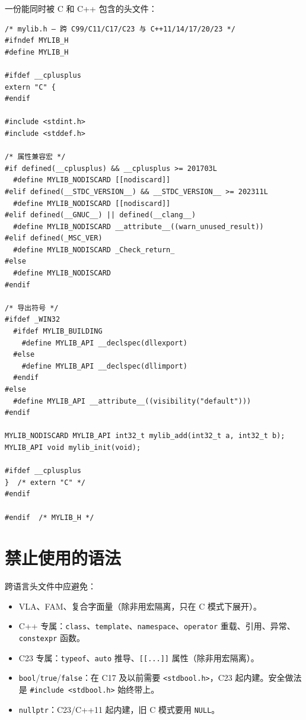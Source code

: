 \documentclass[12pt,a4paper,fontset=fandol]{ctexbook}
\newcommand{\cpplabel}{%
  \tcbox[on line,colback=cppheadbg,colframe=cppheadbg,
    boxrule=0pt,arc=1pt,left=2pt,right=2pt,top=1pt,bottom=1pt,
    colupper=white,fontupper=\scriptsize\bfseries]{C++}}
\newcommand{\cpp}[1]{C++#1}
\newcommand{\kw}[1]{\texttt{#1}}
\begin{document}
\cpplabel{} 一份能同时被 C 和 \cpp{} 包含的头文件：

\begin{lstlisting}
/* mylib.h — 跨 C99/C11/C17/C23 与 C++11/14/17/20/23 */
#ifndef MYLIB_H
#define MYLIB_H

#ifdef __cplusplus
extern "C" {
#endif

#include <stdint.h>
#include <stddef.h>

/* 属性兼容宏 */
#if defined(__cplusplus) && __cplusplus >= 201703L
  #define MYLIB_NODISCARD [[nodiscard]]
#elif defined(__STDC_VERSION__) && __STDC_VERSION__ >= 202311L
  #define MYLIB_NODISCARD [[nodiscard]]
#elif defined(__GNUC__) || defined(__clang__)
  #define MYLIB_NODISCARD __attribute__((warn_unused_result))
#elif defined(_MSC_VER)
  #define MYLIB_NODISCARD _Check_return_
#else
  #define MYLIB_NODISCARD
#endif

/* 导出符号 */
#ifdef _WIN32
  #ifdef MYLIB_BUILDING
    #define MYLIB_API __declspec(dllexport)
  #else
    #define MYLIB_API __declspec(dllimport)
  #endif
#else
  #define MYLIB_API __attribute__((visibility("default")))
#endif

MYLIB_NODISCARD MYLIB_API int32_t mylib_add(int32_t a, int32_t b);
MYLIB_API void mylib_init(void);

#ifdef __cplusplus
}  /* extern "C" */
#endif

#endif  /* MYLIB_H */
\end{lstlisting}

\section{禁止使用的语法}

跨语言头文件中应避免：
\begin{itemize}
  \item VLA、FAM、复合字面量（除非用宏隔离，只在 C 模式下展开）。
  \item \cpp{} 专属：\kw{class}、\kw{template}、\kw{namespace}、\kw{operator} 重载、引用、异常、\kw{constexpr} 函数。
  \item C23 专属：\kw{typeof}、\kw{auto} 推导、\kw{[[...]]} 属性（除非用宏隔离）。
  \item \kw{bool}/\allowbreak{}\kw{true}/\allowbreak{}\kw{false}：在 C17 及以前需要 \kw{<stdbool.h>}，C23 起内建。安全做法是 \kw{\#include <stdbool.h>} 始终带上。
  \item \kw{nullptr}：C23/C++11 起内建，旧 C 模式要用 \kw{NULL}。
\end{itemize}
\end{document}
